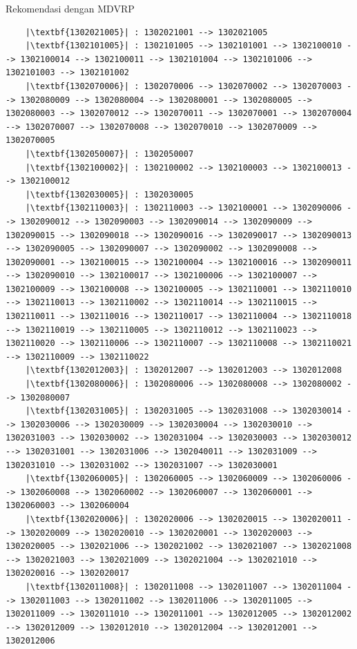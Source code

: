 \begin{listing}[!]
	\caption{Rekomendasi dengan MDVRP}
	\label{lst:analysis_mtsp_recommendation}
	\begin{verbatim}
	|\textbf{1302021005}| : 1302021001 --> 1302021005
	|\textbf{1302101005}| : 1302101005 --> 1302101001 --> 1302100010 --> 1302100014 --> 1302100011 --> 1302101004 --> 1302101006 --> 1302101003 --> 1302101002
	|\textbf{1302070006}| : 1302070006 --> 1302070002 --> 1302070003 --> 1302080009 --> 1302080004 --> 1302080001 --> 1302080005 --> 1302080003 --> 1302070012 --> 1302070011 --> 1302070001 --> 1302070004 --> 1302070007 --> 1302070008 --> 1302070010 --> 1302070009 --> 1302070005
	|\textbf{1302050007}| : 1302050007
	|\textbf{1302100002}| : 1302100002 --> 1302100003 --> 1302100013 --> 1302100012
	|\textbf{1302030005}| : 1302030005
	|\textbf{1302110003}| : 1302110003 --> 1302100001 --> 1302090006 --> 1302090012 --> 1302090003 --> 1302090014 --> 1302090009 --> 1302090015 --> 1302090018 --> 1302090016 --> 1302090017 --> 1302090013 --> 1302090005 --> 1302090007 --> 1302090002 --> 1302090008 --> 1302090001 --> 1302100015 --> 1302100004 --> 1302100016 --> 1302090011 --> 1302090010 --> 1302100017 --> 1302100006 --> 1302100007 --> 1302100009 --> 1302100008 --> 1302100005 --> 1302110001 --> 1302110010 --> 1302110013 --> 1302110002 --> 1302110014 --> 1302110015 --> 1302110011 --> 1302110016 --> 1302110017 --> 1302110004 --> 1302110018 --> 1302110019 --> 1302110005 --> 1302110012 --> 1302110023 --> 1302110020 --> 1302110006 --> 1302110007 --> 1302110008 --> 1302110021 --> 1302110009 --> 1302110022
	|\textbf{1302012003}| : 1302012007 --> 1302012003 --> 1302012008
	|\textbf{1302080006}| : 1302080006 --> 1302080008 --> 1302080002 --> 1302080007
	|\textbf{1302031005}| : 1302031005 --> 1302031008 --> 1302030014 --> 1302030006 --> 1302030009 --> 1302030004 --> 1302030010 --> 1302031003 --> 1302030002 --> 1302031004 --> 1302030003 --> 1302030012 --> 1302031001 --> 1302031006 --> 1302040011 --> 1302031009 --> 1302031010 --> 1302031002 --> 1302031007 --> 1302030001
	|\textbf{1302060005}| : 1302060005 --> 1302060009 --> 1302060006 --> 1302060008 --> 1302060002 --> 1302060007 --> 1302060001 --> 1302060003 --> 1302060004
	|\textbf{1302020006}| : 1302020006 --> 1302020015 --> 1302020011 --> 1302020009 --> 1302020010 --> 1302020001 --> 1302020003 --> 1302020005 --> 1302021006 --> 1302021002 --> 1302021007 --> 1302021008 --> 1302021003 --> 1302021009 --> 1302021004 --> 1302021010 --> 1302020016 --> 1302020017
	|\textbf{1302011008}| : 1302011008 --> 1302011007 --> 1302011004 --> 1302011003 --> 1302011002 --> 1302011006 --> 1302011005 --> 1302011009 --> 1302011010 --> 1302011001 --> 1302012005 --> 1302012002 --> 1302012009 --> 1302012010 --> 1302012004 --> 1302012001 --> 1302012006

\end{verbatim}
\end{listing}
